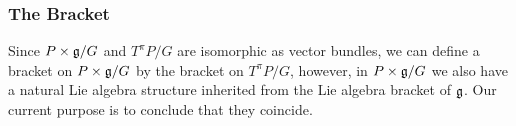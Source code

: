\subsubsection{The Bracket}

Since $P \times \mathfrak{g}/G$ and $T^\pi P/G$ are isomorphic as vector bundles, we can define a bracket on $P \times \mathfrak{g}/G$ by the bracket on $T^\pi P/G$, however, in $P \times \mathfrak{g}/G$ we also have a natural Lie algebra structure inherited from the Lie algebra bracket of $\mathfrak{g}$. Our current purpose is to conclude that they coincide.





